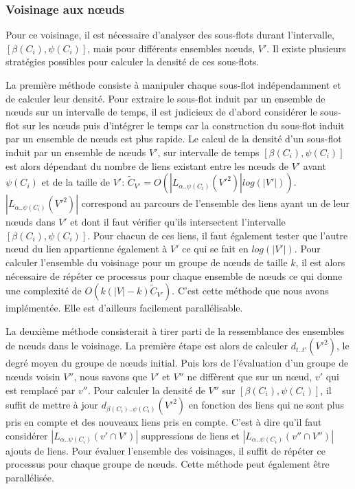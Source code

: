 \subsubsection{Voisinage aux n\oe{}uds}
Pour ce voisinage, il est nécessaire d'analyser des sous-flots durant l'intervalle, $[\beta(C_i),\psi(C_i)]$, mais pour différents ensembles n\oe{}uds, $V'$.
Il existe plusieurs stratégies possibles pour calculer la densité  de ces sous-flots. 

La première méthode consiste à manipuler chaque sous-flot indépendamment et de calculer leur densité.
Pour extraire le sous-flot induit par un ensemble de n\oe{}uds sur un intervalle de temps,
il est judicieux de d'abord considérer le sous-flot sur les n\oe{}uds puis d'intégrer le temps  car la construction du sous-flot induit par un ensemble de n\oe{}uds est plus rapide.
Le calcul de la densité d'un sous-flot induit par un ensemble de n\oe{}uds $V'$, sur intervalle de temps $[\beta(C_i),\psi(C_i)]$ est alors dépendant du nombre de liens existant entre les n\oe{}uds de $V'$ avant $\psi(C_i)$ et de la taille de $V'$: $\tilde{C}_{V'}=O(|L_{\alpha..\psi(C_i)}(V'^2)|log(|V'|))$.
$|L_{\alpha..\psi(C_i)}(V'^2)|$ correspond au parcours de l'ensemble des liens ayant un de leur n\oe{}uds dans $V'$ et dont il faut vérifier  qu'ils intersectent l'intervalle $[\beta(C_i),\psi(C_i)]$.
Pour chacun de ces liens, il faut également tester que l'autre n\oe{}ud du lien appartienne également à $V'$ ce qui se fait en $log(|V'|)$.
Pour calculer l'ensemble du voisinage pour un groupe de n\oe{}uds de taille $k$, il est alors nécessaire de répéter ce processus pour chaque ensemble de n\oe{}uds ce qui donne une complexité de $O(k(|V|-k) \tilde{C}_{V'})$.
C'est cette méthode que nous avons implémentée.
Elle est d'ailleurs facilement parallélisable.

La deuxième méthode consisterait à tirer parti de la ressemblance des ensembles de n\oe{}uds dans le voisinage.
La première étape est alors de calculer $d_{t..t'}(V'^2)$, le degré moyen du groupe de n\oe{}uds initial.
Puis lors de l'évaluation d'un groupe de n\oe{}uds voisin $V''$, nous savons que $V'$ et $V''$ ne diffèrent que sur un n\oe{}ud, $v'$ qui est remplacé par $v''$.
Pour calculer la densité de $V''$ sur $[\beta(C_i),\psi(C_i)]$, il suffit de mettre à jour $d_{\beta(C_i)..\psi(C_i)}(V'^2)$ en fonction des liens qui ne sont plus pris en compte et des nouveaux liens pris en compte.
C'est à dire qu'il faut considérer $|L_{\alpha..\psi(C_i)}({v'} \cap V')|$ suppressions de liens et  $|L_{\alpha..\psi(C_i)}({v''} \cap V'')|$ ajouts de liens.
Pour évaluer l'ensemble des voisinages, il suffit de répéter ce processus pour chaque groupe de n\oe{}uds.
Cette méthode peut également être parallélisée.


